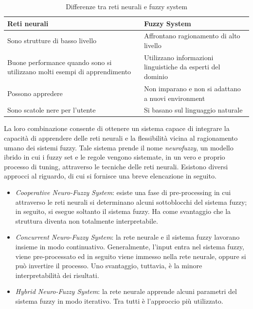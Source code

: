 \documentclass[11pt,  oneside, openany]{book}
\begin{document}
\begin{table}[h!]
\centering
\begin{tabular}{ |p{7cm}|p{7cm}| } 
\hline
\textbf{Reti neurali} & \textbf{Fuzzy System} \\
\hline
\hline
Sono strutture di basso livello & Affrontano ragionamento di alto livello\\ 
\hline
Buone performance quando sono si utilizzano molti esempi di apprendimento & Utilizzano informazioni linguistiche da esperti del dominio \\
\hline
Possono appredere & Non imparano e non si adattano a nuovi environment \\
\hline
Sono scatole nere per l'utente & Si basano sul linguaggio naturale\\
\hline

\end{tabular}
\caption{Differenze tra reti neurali e fuzzy system}
\label{table:0}
\end{table}

La loro combinazione consente di ottenere un sistema capace di integrare la capacità di apprendere delle reti neurali e la flessibilità vicina al ragionamento umano dei sistemi fuzzy. Tale sistema prende il nome \textit{neurofuzzy}, un modello ibrido in cui i fuzzy set e le regole vengono sistemate, in un vero e proprio processo di tuning, attraverso le tecniche delle reti neurali. 
Esistono diversi approcci al riguardo, di cui si fornisce una breve elencazione in seguito. 

\begin{itemize}
\item \textit{Cooperative Neuro-Fuzzy System}: esiste una fase di pre-processing in cui attraverso le reti neurali si determinano alcuni sottoblocchi del sistema fuzzy; in seguito, si esegue soltanto il sistema fuzzy. Ha come svantaggio che la struttura diventa non totalmente interpretabile. 
\item \textit{Concurrent Neuro-Fuzzy System}: la rete neurale e il sistema fuzzy lavorano insieme in modo continuativo. Generalmente, l'input entra nel sistema fuzzy, viene pre-processato ed in seguito viene immesso nella rete neurale, oppure si può invertire il processo. Uno svantaggio, tuttavia, è la minore interpretabilità dei risultati. 
\item \textit{Hybrid Neuro-Fuzzy System}: la rete neurale apprende alcuni parametri del sistema fuzzy in modo iterativo. Tra tutti è l'approccio più utilizzato. 
\end{itemize}
\end{document}
